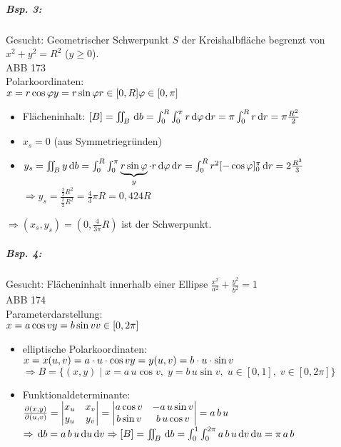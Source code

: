 \subparagraph{Bsp. 3:} Gesucht: Geometrischer Schwerpunkt $S$ der Kreishalbfläche begrenzt von $x^2+y^2=R^2$ ($y\geq 0$).\\
ABB 173\\
Polarkoordinaten:\\
$x=r\cos \varphi\\
y=r\sin \varphi\\
r\in [0,R]\\
\varphi\in[0,\pi]$
\begin{itemize}
\item Flächeninhalt: $[B]=\iint_B \,\mathrm{d}b = \int_0^R \int_0^{\pi} r \,\mathrm{d}\varphi\,\mathrm{d}r= \pi\int_0^R r \,\mathrm{d}r=\pi\frac{R^2}{2}$
\item $x_s=0$ (aus Symmetriegründen)
\item $y_s=\iint_B y \,\mathrm{d}b=\int_0^R\int_0^\pi \underbrace{r \sin \varphi}_{y}\cdot r \,\mathrm{d}\varphi \,\mathrm{d}r=\int_0^R r^2[-\cos \varphi]_0^\pi \,\mathrm{d}r=2\frac{R^3}{3}$\\
$\Rightarrow y_s=\frac{\frac{2}{3}R^2}{\frac{\pi}{2}R^2}=\frac{4}{3}\pi R = 0,424 R$
\end{itemize}
$\Rightarrow (x_s,y_s)=\left(0,\frac{4}{3\pi}R\right)$ ist der Schwerpunkt.

\subparagraph{Bsp. 4:} Gesucht: Flächeninhalt innerhalb einer Ellipse $\frac{x^2}{a^2}+\frac{y^2}{b^2}=1$\\
ABB 174\\
Parameterdarstellung:\\
$x=a\cos v\\
y=b\sin v\\
v\in [0,2\pi]$
\begin{itemize}
\item elliptische Polarkoordinaten:\\
$x=x(u,v)=a\cdot u \cdot \cos v\\
y=y(u,v) = b\cdot u \cdot \sin v$
$\Rightarrow B=\{(x,y)\;|\; x=a\,u\cos v,\; y = b\, u \sin v,\; u\in[0,1], \; v \in [0,2\pi]\}$
\item Funktionaldeterminante:\\
$\frac{\partial (x,y)}{\partial (u,v)}=\begin{vmatrix}x_u& x_v \\ y_u & y_v\end{vmatrix}=\begin{vmatrix}a \cos v & - a\,u \sin v\\ b \sin v & b \, u \cos v\end{vmatrix}=a\,b\,u$\\
$\Rightarrow \,\mathrm{d}b=a\,b\,u\,\mathrm{d}u\,\mathrm{d}v\\
\Rightarrow [B]=\iint_B \,\mathrm{d}b=\int_0^1\int_0^{2\pi} a \, b \, u \,\mathrm{d}v\,\mathrm{d}u=\pi \, a \, b$
\end{itemize}


